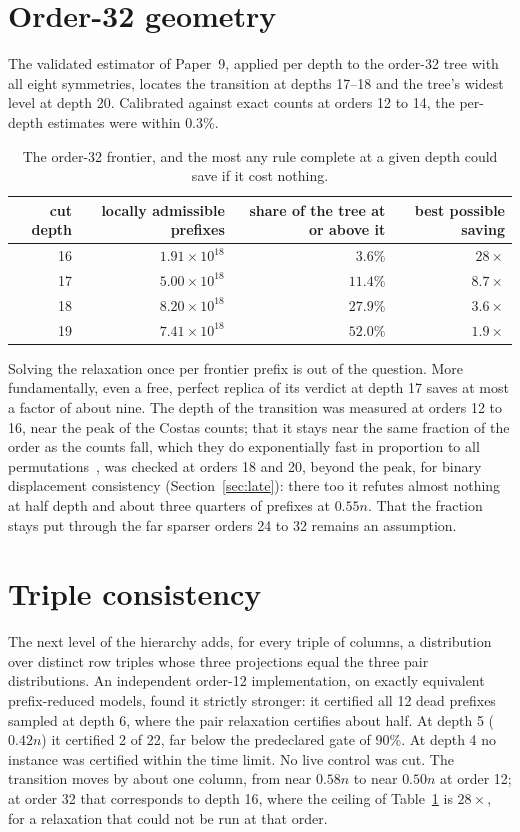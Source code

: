 \section{Order-32 geometry}
\label{sec:geometry}
The validated estimator of Paper~9, applied per depth to the order-32 tree with all eight symmetries,
locates the transition at depths 17--18 and the tree's widest level at depth 20. Calibrated against exact
counts at orders 12 to 14, the per-depth estimates were within $0.3\%$.

\begin{table}[H]
\centering
\small
\begin{tabular}{@{}rrrr@{}}
\toprule
cut depth & locally admissible prefixes & share of the tree at or above it & best possible saving \\
\midrule
16 & $1.91\times10^{18}$ & $3.6\%$ & $28\times$ \\
17 & $5.00\times10^{18}$ & $11.4\%$ & $8.7\times$ \\
18 & $8.20\times10^{18}$ & $27.9\%$ & $3.6\times$ \\
19 & $7.41\times10^{18}$ & $52.0\%$ & $1.9\times$ \\
\bottomrule
\end{tabular}
\caption{The order-32 frontier, and the most any rule complete at a given depth could save if it cost
nothing.}
\label{tab:frontier}
\end{table}

\noindent Solving the relaxation once per frontier prefix is out of the question. More fundamentally, even a
free, perfect replica of its verdict at depth 17 saves at most a factor of about nine. The depth of the transition was measured at orders 12 to 16, near the
peak of the Costas counts; that it stays near the same fraction of the order as the counts fall, which
they do exponentially fast in proportion to all permutations~\cite{warnke2023density}, was checked at orders
18 and 20, beyond the peak, for binary displacement consistency (Section~\ref{sec:late}): there too it
refutes almost nothing at half depth and about three quarters of prefixes at $0.55n$. That the fraction
stays put through the far sparser orders 24 to 32 remains an assumption.

\section{Triple consistency}
\label{sec:triple}
The next level of the hierarchy adds, for every triple of columns, a distribution over distinct row triples
whose three projections equal the three pair distributions. An independent order-12 implementation, on
exactly equivalent prefix-reduced models, found it strictly stronger: it certified all 12 dead prefixes
sampled at depth 6, where the pair relaxation certifies about half. At depth 5 ($0.42n$) it certified 2 of 22,
far below the predeclared gate of 90\%. At depth 4 no instance was certified within the time limit. No live
control was cut. The transition moves by about one column, from near $0.58n$ to near $0.50n$ at order 12; at
order 32 that corresponds to depth 16, where the ceiling of Table~\ref{tab:frontier} is $28\times$, for a
relaxation that could not be run at that order.

